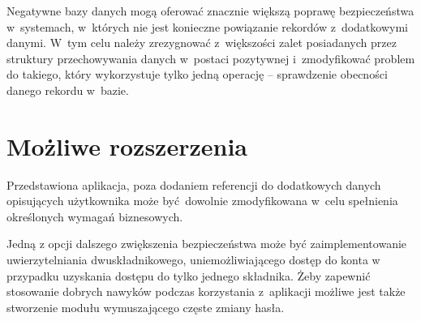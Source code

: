 Negatywne bazy danych mogą oferować znacznie większą poprawę bezpieczeństwa w~systemach, w~których nie jest konieczne powiązanie rekordów z~dodatkowymi danymi.
W~tym celu należy zrezygnować z~większości zalet posiadanych przez struktury przechowywania danych w~postaci pozytywnej i~zmodyfikować problem do takiego, który wykorzystuje tylko jedną operację -- sprawdzenie obecności danego rekordu w~bazie.

\section{Możliwe rozszerzenia}
Przedstawiona aplikacja, poza dodaniem referencji do dodatkowych danych opisujących użytkownika może być dowolnie zmodyfikowana w~celu spełnienia określonych wymagań biznesowych. 

Jedną z opcji dalszego zwiększenia bezpieczeństwa może być zaimplementowanie 
uwierzytelniania dwuskładnikowego, uniemożliwiającego dostęp do konta w przypadku uzyskania dostępu do tylko jednego składnika. Żeby zapewnić stosowanie dobrych nawyków podczas korzystania z~aplikacji możliwe jest także stworzenie modułu wymuszającego częste zmiany hasła.